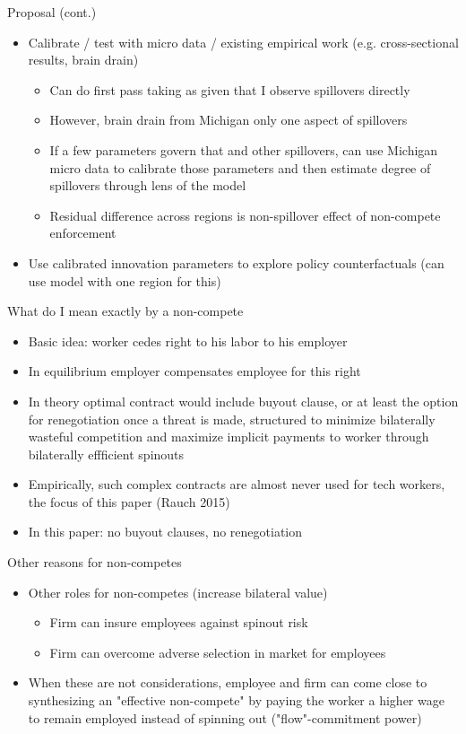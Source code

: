 \begin{frame}{Proposal (cont.)}
\begin{itemize}
	\item Calibrate / test with micro data / existing empirical work (e.g. cross-sectional results, brain drain)
	\begin{itemize}
		\item Can do first pass taking as given that I observe spillovers directly
		\item However, brain drain from Michigan only one aspect of spillovers
		\item If a few parameters govern that and other spillovers, can use Michigan micro data to calibrate those parameters and then estimate degree of spillovers through lens of the model
		\item Residual difference across regions is non-spillover effect of non-compete enforcement 
	\end{itemize}
	\item Use calibrated innovation parameters to explore policy counterfactuals (can use model with one region for this)
\end{itemize}
\end{frame}

\begin{frame}{What do I mean exactly by a non-compete}
\begin{itemize}
	\item Basic idea: worker cedes right to his labor to his employer
	\item In equilibrium employer compensates employee for this right 
	\item In theory optimal contract would include buyout clause, or at least the option for renegotiation once a threat is made, structured to minimize bilaterally wasteful competition and maximize implicit payments to worker through bilaterally effficient spinouts
	\item Empirically, such complex contracts are almost never used for tech workers, the focus of this paper (Rauch 2015)  
	\item In this paper: no buyout clauses, no renegotiation
\end{itemize}
\end{frame}

\begin{frame}{Other reasons for non-competes}
\begin{itemize}
	\item Other roles for non-competes (increase bilateral value)
	\begin{itemize}
		\item Firm can insure employees against spinout risk
		\item Firm can overcome adverse selection in market for employees
	\end{itemize}
	\item When these are not considerations, employee and firm can come close to synthesizing an "effective non-compete" by paying the worker a higher wage to remain employed instead of spinning out ("flow"-commitment power) 
\end{itemize}
\end{frame}